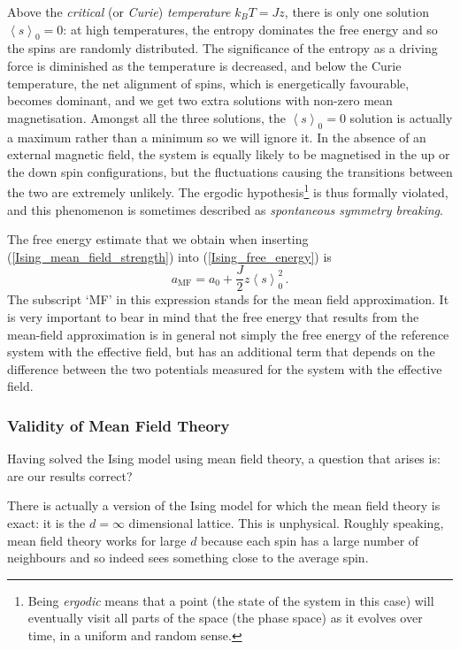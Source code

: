 \documentclass{article}
\theoremstyle{plain}\theoremheaderfont{\normalfont\bfseries}\theorembodyfont{\rmfamily}\theoremseparator{.}\newtheorem*{thm}{Theorem}\newtheorem*{law}{Law}\newtheorem*{pos}{Postulate}
\numberwithin{equation}{section}
\newcommand{\eval}[1]{\left\langle #1 \right\rangle}
\begin{document}
    Above the \textit{critical} (or \textit{Curie}) \textit{temperature} \(k_B T=Jz\), there is only one solution \(\eval{s}_0=0\): at high temperatures, the entropy dominates the free energy and so the spins are randomly distributed. The significance of the entropy as a driving force is diminished as the temperature is decreased, and below the Curie temperature, the net alignment of spins, which is energetically favourable, becomes dominant, and we get two extra solutions with non-zero mean magnetisation. Amongst all the three solutions, the \(\eval{s}_0=0\) solution is actually a maximum rather than a minimum so we will ignore it. In the absence of an external magnetic field, the system is equally likely to be magnetised in the up or the down spin configurations, but the fluctuations causing the transitions between the two are extremely unlikely. The ergodic hypothesis\footnote{Being \textit{ergodic} means that a point (the state of the system in this case) will eventually visit all parts of the space (the phase space) as it evolves over time, in a uniform and random sense.} is thus formally violated, and this phenomenon is sometimes described as \textit{spontaneous symmetry breaking}.

    The free energy estimate that we obtain when inserting (\ref{Ising_mean_field_strength}) into (\ref{Ising_free_energy}) is
    \begin{equation}\label{Ising_MF_free_energy}
        a_{\text{MF}}=a_0+\frac{J}{2}z\eval{s}_0^2\,.
    \end{equation}
    The subscript `MF' in this expression stands for the mean field approximation. It is very important to bear in mind that the free energy that results from the mean-field approximation is in general not simply the free energy of the reference system with the effective field, but has an additional term that depends on the difference between the two potentials measured for the system with the effective field.
    \subsubsection{Validity of Mean Field Theory}
    Having solved the Ising model using mean field theory, a question that arises is: are our results correct?

    There is actually a version of the Ising model for which the mean field theory is exact: it is the \(d=\infty\) dimensional lattice. This is unphysical. Roughly speaking, mean field theory works for large \(d\) because each spin has a large number of neighbours and so indeed sees something close to the average spin.
    
\end{document}
